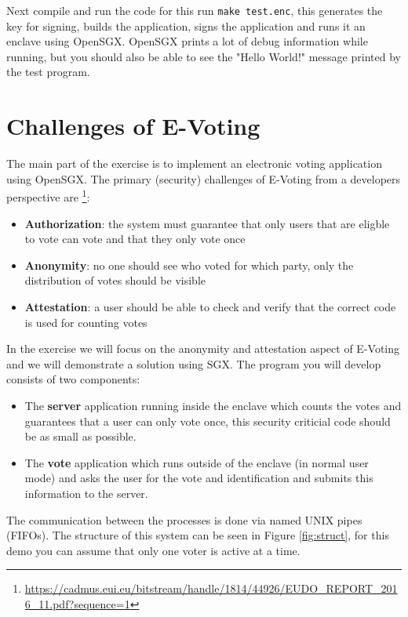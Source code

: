 \documentclass{uulm-assignment}
\begin{document}
    Next compile and run the code for this run \texttt{make test.enc}, this generates the key for signing,
    builds the application, signs the application and runs it an enclave using OpenSGX.
    OpenSGX prints a lot of debug information while running, but you should also be able to see the "Hello World!"
    message printed by the test program.

    \section{Challenges of E-Voting}
    The main part of the exercise is to implement an electronic voting application using OpenSGX. 
    The primary (security) challenges of E-Voting from a developers perspective are
    \footnote{\url{https://cadmus.eui.eu/bitstream/handle/1814/44926/EUDO_REPORT_2016_11.pdf?sequence=1}}:
    \begin{itemize}
        \item \textbf{Authorization}: the system must guarantee that only users that are eligble to vote can vote and that they only vote once
        \item \textbf{Anonymity}: no one should see who voted for which party, only the distribution of votes should be visible
        \item \textbf{Attestation}: a user should be able to check and verify that the correct code is used for counting votes
    \end{itemize}

    In the exercise we will focus on the anonymity and attestation aspect of E-Voting and we will demonstrate a 
    solution using SGX. The program you will develop consists of two components:
    \begin{itemize}
        \item The \textbf{server} application running inside the enclave which counts the votes and guarantees 
            that a user can only vote once, this security criticial code should be as small as possible.
        \item The \textbf{vote} application which runs outside of the enclave (in normal user mode) and asks the user 
            for the vote and identification and submits this information to the server.
    \end{itemize}
    The communication between the processes is done via named UNIX pipes (FIFOs). The structure
    of this system can be seen in Figure \ref{fig:struct}, for this demo you can
    assume that only one voter is active at a time.
    
\end{document}
